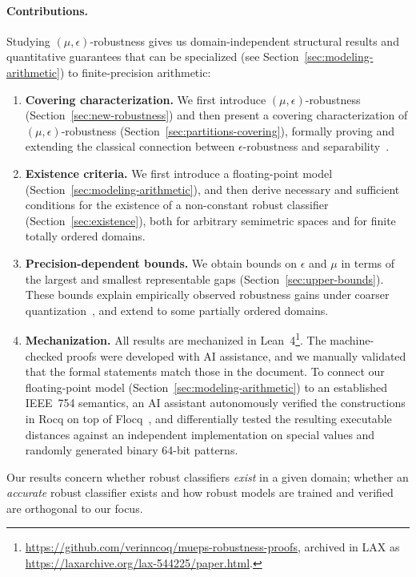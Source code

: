 \paragraph{Contributions.}
Studying $(\mu,\epsilon)$-robustness gives us domain-independent structural results and quantitative guarantees that can be specialized (see Section~\ref{sec:modeling-arithmetic}) to finite-precision arithmetic:
\begin{enumerate}
\item \textbf{Covering characterization.}
We first introduce $(\mu,\epsilon)$-robustness (Section~\ref{sec:new-robustness})
and then present a covering characterization of $(\mu,\epsilon)$-robustness (Section~\ref{sec:partitions-covering}), formally proving and extending the classical connection between $\epsilon$-robustness and separability~\cite{yang2020closer,mangal2023certifying}.

\item \textbf{Existence criteria.}
We first introduce a floating-point model (Section~\ref{sec:modeling-arithmetic}), and
then 
derive necessary and sufficient conditions for the existence of a non-constant robust classifier (Section~\ref{sec:existence}), both for arbitrary semimetric spaces and for finite totally ordered domains.

\item \textbf{Precision-dependent bounds.}
We obtain bounds on $\epsilon$ and $\mu$ in terms of the largest and smallest representable gaps (Section~\ref{sec:upper-bounds}). These bounds explain empirically observed robustness gains under coarser quantization~\cite{xiao2023robustmq,shrestha2024properties,duncan2020relative}, and extend to some partially ordered domains.

\item \textbf{Mechanization.} All results are mechanized in Lean~4\footnote{\url{https://github.com/verinncoq/mueps-robustness-proofs},
  archived in LAX as \url{https://laxarchive.org/lax-544225/paper.html}.}. 
  The machine-checked proofs were
  developed with AI assistance, and we manually validated
  that the formal statements match those in the document. To connect our
  floating-point model (Section~\ref{sec:modeling-arithmetic}) to an established IEEE~754 semantics, an AI assistant autonomously
  verified the constructions in Rocq on top of
  Flocq~\cite{boldo2011flocq}, and differentially tested the resulting executable
  distances against an independent implementation on special values and
  randomly generated binary 64-bit patterns.

\end{enumerate}
Our results concern whether robust classifiers \emph{exist} in a given domain;
whether an \emph{accurate} robust classifier exists and how robust
models are trained and verified are orthogonal to our focus.